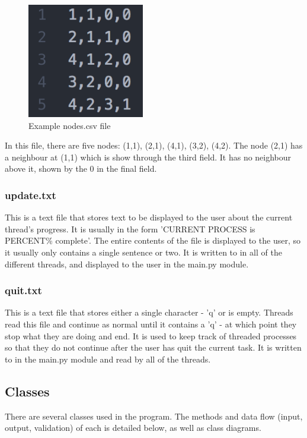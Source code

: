 \documentclass[titlepage]{article}
\begin{document}
\begin{figure}[H]
  \centering
  \includegraphics[height=5cm]{noody.png}
  \caption{Example nodes.csv file}
  \label{fig:dijk}
\end{figure}

In this file, there are five nodes: (1,1), (2,1), (4,1), (3,2), (4,2). The node (2,1) has a neighbour at (1,1) which is show through the third field. It has no neighbour above it, shown by the 0 in the final field.

\subsubsection{update.txt}
This is a text file that stores text to be displayed to the user about the current thread's progress. It is usually in the form 'CURRENT PROCESS is PERCENT\% complete'. The entire contents of the file is displayed to the user, so it usually only contains a single sentence or two. It is written to in all of the different threads, and displayed to the user in the main.py module.

\subsubsection{quit.txt}
This is a text file that stores either a single character - 'q' or is empty. Threads read this file and continue as normal until it contains a 'q' - at which point they stop what they are doing and end. It is used to keep track of threaded processes so that they do not continue after the user has quit the current task. It is written to in the main.py module and read by all of the threads.

\subsection{Classes}
There are several classes used in the program. The methods and data flow (input, output, validation) of each is detailed below, as well as class diagrams.
\end{document}
